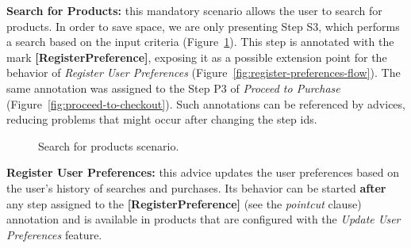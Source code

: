 {\bf Search for Products:} this mandatory scenario allows the user to search for
products. In order to save space, we are only presenting Step S3, which performs
a search based on the input criteria (Figure~\ref{fig:search-products-flow}).
This step is annotated with the mark \mbox{{\bf [RegisterPreference]}}, exposing
it as a possible extension point for the behavior of \emph{Register User
Preferences} (Figure~\ref{fig:register-preferences-flow}). The same annotation
was assigned to the Step P3 of \emph{Proceed to Purchase}
(Figure~\ref{fig:proceed-to-checkout}). Such annotations can be referenced by advices, reducing problems
that might occur after changing the step ids.

\begin{figure}[ht]
\caption{Search for products scenario.}
\label{fig:search-products-flow}
\end{figure}

{\bf Register User Preferences:} this advice updates the user preferences based
on the user's history of searches and purchases. Its behavior can be started {\bf
after} any step assigned to the {\bf [RegisterPreference]} (see the
\emph{pointcut} clause) annotation and is available in products that are
configured with the \emph{Update User Preferences} feature.

